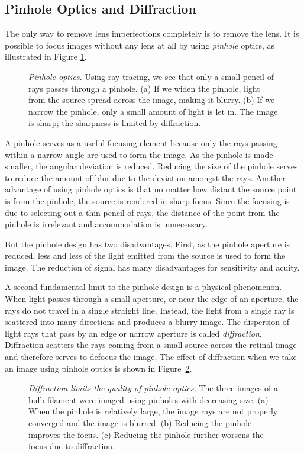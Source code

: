 \subsection*{Pinhole Optics and Diffraction}
The only way to remove lens imperfections completely
is to remove the lens.
It is possible to focus images without any lens at all
by using {\em pinhole} optics, as illustrated
in Figure \ref{f1:pinhole}.
\begin{figure}
\centerline {
}
\caption[Pinhole Optics]{ 
{\em Pinhole optics.}
Using ray-tracing, we see that only a small pencil of
rays passes through a pinhole.
(a)  If we widen the pinhole, light from the source spread across
the image, making it blurry.
(b)  If we narrow the pinhole,
only a small amount of light is let in.
The image is sharp;  the sharpness is limited by diffraction.
}
\label{f1:pinhole}
\end{figure}
A pinhole serves as a useful focusing element
because only the rays passing within a
narrow angle are used to form the image.
As the pinhole is made smaller,
the angular deviation is reduced.
Reducing the size of the pinhole
serves to reduce the amount of blur due to the
deviation amongst the rays.
Another advantage of using pinhole optics is that no matter
how distant the source point is from the pinhole,
the source is rendered in sharp focus.
Since the focusing is due to selecting out a thin pencil
of rays, the distance of the point from the pinhole
is irrelevant and accommodation is unnecessary.

But the pinhole design has two disadvantages.
First, as the pinhole aperture is reduced, less and less
of the light emitted from the source is used to
form the image.
The reduction of signal has
many disadvantages for sensitivity
and acuity.

A second fundamental limit to the pinhole design
is a physical phenomenon.
When light passes through a small aperture,
or near the edge of an aperture,
the rays do not travel in a single straight line.
Instead, the light from a single ray is scattered into many
directions and produces a blurry image.
The dispersion of light rays that pass by an edge or
narrow aperture is called {\em diffraction}.
Diffraction scatters the rays coming from a small
source across the retinal image and therefore
serves to defocus the image.
The effect of diffraction when we take an
image using pinhole optics is shown 
in Figure~\ref{f1:filament}.
\begin{figure}
\centerline{
}
\caption[Diffraction limited pinhole image]{
{\em Diffraction limits the quality of pinhole optics.}
The three images of a bulb filament were
imaged using pinholes with decreasing size.
(a) When the pinhole is relatively large, the image rays are not properly
converged and the image is blurred.
(b) Reducing the pinhole improves the focus.
(c) Reducing the pinhole further worsens the focus
due to diffraction.
}
\label{f1:filament}
\end{figure}

